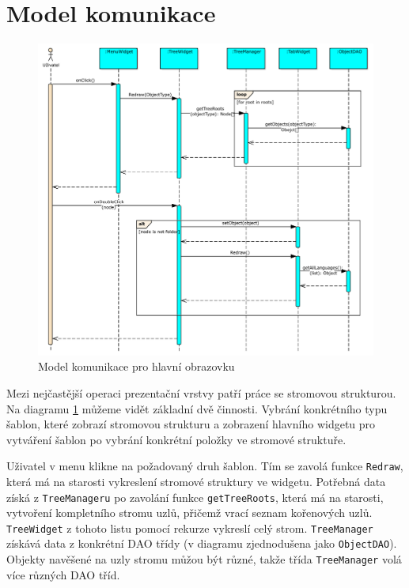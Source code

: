 \documentclass[thesis=B,czech]{resources/FITthesis}[2012/06/26]
\begin{document}
	\section{Model komunikace}
	\begin{figure}\centering
	\includegraphics[width=1\textwidth]{images/comunication_main}
	\caption[Model komunikace pro hlavní obrazovku]{Model komunikace pro hlavní obrazovku}\label{fig:comunication_main}
	\end{figure}
Mezi nejčastější operaci prezentační vrstvy patří práce se stromovou strukturou. Na diagramu \ref{fig:comunication_main} můžeme vidět základní dvě činnosti. Vybrání konkrétního typu šablon, které zobrazí stromovou strukturu a zobrazení hlavního widgetu pro vytváření šablon po vybrání konkrétní položky ve stromové struktuře.\par

Uživatel v menu klikne na požadovaný druh šablon. Tím se zavolá funkce \texttt{Redraw}, která má na starosti vykreslení stromové struktury ve widgetu. Potřebná data získá z \texttt{TreeManageru} po zavolání funkce \texttt{getTreeRoots}, která má na starosti, vytvoření kompletního stromu uzlů, přičemž vrací seznam kořenových uzlů. \texttt{TreeWidget} z tohoto listu pomocí rekurze vykreslí celý strom. \texttt{TreeManager} získává data z konkrétní DAO třídy (v diagramu zjednodušena jako \texttt{ObjectDAO}). Objekty navěšené na uzly stromu můžou být různé, takže třída \texttt{TreeManager} volá více různých DAO tříd.\par
\end{document}
